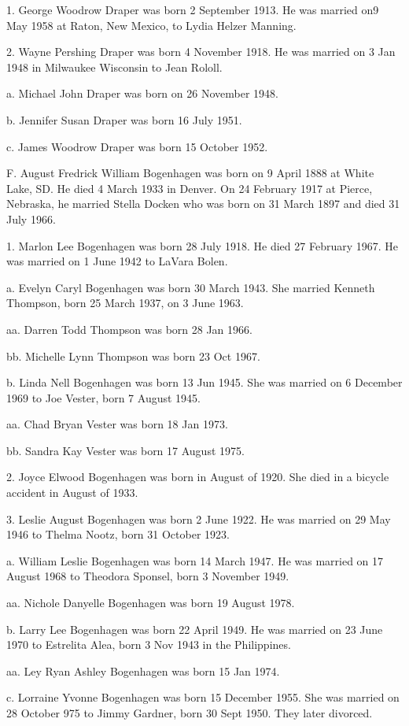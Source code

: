 \documentclass[a4paper]{article}
\begin{document}
1. George Woodrow Draper was born 2 September 1913.  He was married on9 May 1958 at Raton, New Mexico, to Lydia Helzer Manning.

2. Wayne Pershing Draper was born 4 November 1918.  He was married on 3 Jan 1948 in Milwaukee Wisconsin to Jean Rololl.
 
a. Michael John Draper was born on 26 November 1948.

b. Jennifer Susan Draper was born 16 July 1951.

c. James Woodrow Draper was born 15 October 1952.

F. August Fredrick William Bogenhagen was born on 9 April 1888 at White Lake, SD. He died 4 March 1933 in Denver.  On 24 February 1917 at Pierce, Nebraska, he married Stella Docken who was born on 31 March 1897 and died 31 July 1966.

1. Marlon Lee Bogenhagen was born 28 July 1918.  He died 27 February 1967. He was married on 1 June 1942 to LaVara Bolen.
 
a. Evelyn Caryl Bogenhagen was born 30 March 1943.  She married Kenneth Thompson, born 25 March 1937, on 3 June 1963.
 
aa. Darren Todd Thompson was born 28 Jan 1966.

bb. Michelle Lynn Thompson was born 23 Oct 1967.

b. Linda Nell Bogenhagen was born 13 Jun 1945.  She was married on 6 December 1969 to Joe Vester, born 7 August 1945.  
 
aa. Chad Bryan Vester was born 18 Jan 1973.

bb. Sandra Kay Vester was born 17 August 1975.

2. Joyce Elwood Bogenhagen was born in August of 1920.  She died in a bicycle accident in August of 1933.

3. Leslie August Bogenhagen was born 2 June 1922.  He was married on 29 May 1946 to Thelma Nootz, born 31 October 1923. 

a. William Leslie Bogenhagen was born 14 March 1947.  He was married on 17 August 1968 to Theodora Sponsel, born 3 November 1949.
 
aa. Nichole Danyelle Bogenhagen was born 19 August 1978.

b. Larry Lee Bogenhagen was born 22 April 1949.  He was married on 23 June 1970 to Estrelita Alea, born 3 Nov 1943 in the Philippines.

aa. Ley Ryan Ashley Bogenhagen was born 15 Jan 1974.

c. Lorraine Yvonne Bogenhagen was born 15 December 1955.  She was married on 28 October 975 to Jimmy Gardner, born 30 Sept 1950. They later divorced.
 
\end{document}
